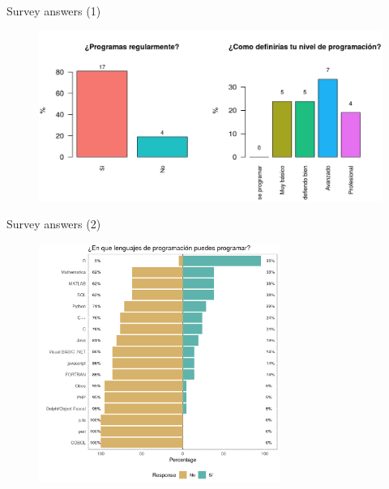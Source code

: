 \documentclass[ignorenonframetext,]{beamer}
\begin{document}
\begin{frame}{%
	\protect\hypertarget{results1}{%
		Survey answers (1)}}

\begin{figure}
	\includegraphics[width=1\textwidth]{"images/results1"}
\end{figure}

\end{frame}

\begin{frame}{%
	\protect\hypertarget{results2}{%
		Survey answers (2)}}

\begin{figure}
	\includegraphics[width=0.7\textwidth]{"images/results2"}
\end{figure}

\end{frame}
\end{document}
